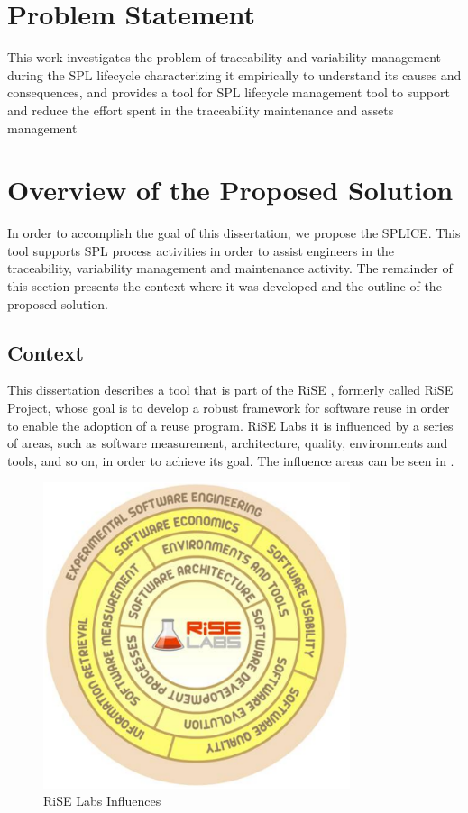 \section{Problem Statement}
\label{sc:problem}
This work investigates the problem of traceability and variability management during the \acf{SPL} lifecycle characterizing it empirically to understand its causes and consequences, and provides a tool for \ac{SPL} lifecycle management tool to support and reduce the effort spent in the traceability maintenance and assets management


\section{Overview of the Proposed Solution}
\label{sc:solution}
In order to accomplish the goal of this dissertation, we propose the \acf{SPLICE}.
This tool supports \acf{SPL} process activities in order to assist engineers in the traceability, variability management and maintenance activity.
 The remainder of this section presents the context where it was developed and the outline of the proposed solution.


\subsection{Context}
This dissertation describes a tool that is part of the \ac{RiSE} \citep{Almeida2004}, formerly
called RiSE Project, whose goal is to develop a robust framework for software
reuse in order to enable the adoption of a reuse program. RiSE Labs it is
influenced by a series of areas, such as software measurement, architecture,
quality, environments and tools, and so on, in order to achieve its goal. The
influence areas can be seen in .

\begin{figure}[htp]
\begin{center}
  \includegraphics[width=9cm]{chapters/introduction/rise-spiral.png}
  \caption[RiSE Labs Influences]{RiSE Labs Influences}
  \label{fg:rise-spiral}
\end{center}
\end{figure}

